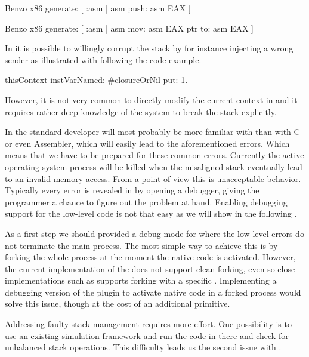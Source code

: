\begin{stcode}[caption={Simple \B code possibly leading to an unbalanced stack.}]{}
Benzo x86 generate: [ :asm |
	asm push: asm EAX ]
\end{stcode}

\begin{stcode}[caption={\B code possibly leading memory access violation.}]{}
Benzo x86 generate: [ :asm |
	asm mov: asm EAX ptr to: asm EAX ]
\end{stcode}

\noindent In \PH it is possible to willingly corrupt the stack by for instance injecting a wrong sender as illustrated with following the code example.
%
\begin{stcode}[label=lst:benzo-pharo-stack-corruption]{}
thisContext instVarNamed: #closureOrNil put: 1.
\end{stcode}
%
However, it is not very common to directly modify the current context in \PH and it requires rather deep knowledge of the system to break the stack explicitly.

In \B the standard developer will most probably be more familiar with \PH than with C or even Assembler, which will easily lead to the aforementioned errors.
Which means that we have to be prepared for these common errors.
Currently the active operating system process will be killed when the misaligned stack eventually lead to an invalid memory access.
From a \PH point of view this is unacceptable behavior.
Typically every error is revealed in \PH by opening a debugger, giving the programmer a chance to figure out the problem at hand.
Enabling debugging support for the low-level \B code is not that easy as we will show in the following .

As a first step we should provided a debug mode for \B where the low-level errors do not terminate the main process.
The most simple way to achieve this is by forking the whole \VM process at the moment the native \B code is activated.
However, the current implementation of the \PH \VM does not support clean forking, even so close implementations such as \Squeak supports forking with a specific .
Implementing a debugging version of the \B plugin to activate native code in a forked process would solve this issue, though at the cost of an additional primitive.

Addressing faulty stack management requires more effort.
One possibility is to use an existing \ASM simulation framework and run the code in there and check for unbalanced stack operations.
This difficulty leads us the second issue with \B.

